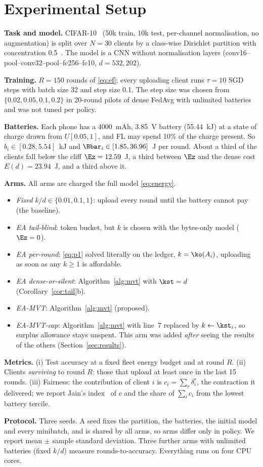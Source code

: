 \section{Experimental Setup}
\textbf{Task and model.} CIFAR-10~\cite{krizhevsky2009} (50k train, 10k test, per-channel normalisation, no augmentation) is split over $N=30$ clients by a class-wise Dirichlet partition with concentration 0.5~\cite{hsu2019}. The model is a CNN without normalisation layers (conv16--pool--conv32--pool--fc256--fc10, $d=532{,}202$).

\textbf{Training.} $R=150$ rounds of \eqref{eq:ef}; every uploading client runs $\tau=10$ SGD steps with batch size 32 and step size 0.1. The step size was chosen from $\{0.02,0.05,0.1,0.2\}$ in 20-round pilots of dense FedAvg with unlimited batteries and was not tuned per policy.

\textbf{Batteries.} Each phone has a 4000~mAh, 3.85~V battery (55.44~kJ) at a state of charge drawn from $U[0.05,1]$, and FL may spend 10\% of the charge present. So $b_i\in[0.28,5.54]$~kJ and $\Bbar_i\in[1.85,36.96]$~J per round. About a third of the clients fall below the cliff $\Ez=12.59$~J, a third between $\Ez$ and the dense cost $E(d)=23.94$~J, and a third above it.

\textbf{Arms.} All arms are charged the full model \eqref{eq:energy}.
\begin{itemize}
\item \emph{Fixed} $k/d\in\{0.01,0.1,1\}$: upload every round until the battery cannot pay (the baseline).
\item \emph{EA tail-blind}: token bucket, but $k$ is chosen with the bytes-only model ($\Ez=0$).
\item \emph{EA per-round}: \eqref{eq:p1} solved literally on the ledger, $k=\ko(A_i)$, uploading as soon as any $k\ge1$ is affordable.
\item \emph{EA dense-or-silent}: Algorithm~\ref{alg:mvt} with $\kst=d$ (Corollary~\ref{cor:tail}b).
\item \emph{EA-MVT}: Algorithm~\ref{alg:mvt} (proposed).
\item \emph{EA-MVT-cap}: Algorithm~\ref{alg:mvt} with line~7 replaced by $k\gets\kst_i$, so surplus allowance stays unspent. This arm was added \emph{after} seeing the results of the others (Section~\ref{sec:results}).
\end{itemize}

\textbf{Metrics.} (i) Test accuracy at a fixed fleet energy budget and at round $R$. (ii) Clients \emph{surviving} to round $R$: those that upload at least once in the last 15 rounds. (iii) Fairness: the contribution of client $i$ is $c_i=\sum_r\delta_i^r$, the contraction it delivered; we report Jain's index~\cite{jain1984} of $c$ and the share of $\sum_i c_i$ from the lowest battery tercile.

\textbf{Protocol.} Three seeds. A seed fixes the partition, the batteries, the initial model and every minibatch, and is shared by all arms, so arms differ only in policy. We report mean $\pm$ sample standard deviation. Three further arms with unlimited batteries (fixed $k/d$) measure rounds-to-accuracy. Everything runs on four CPU cores.
